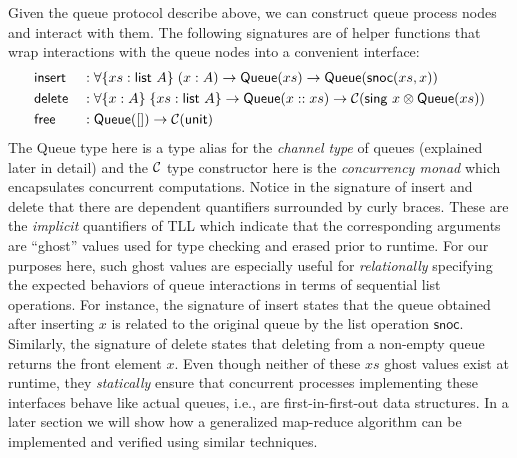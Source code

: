 Given the \textsf{queue} protocol describe above, we can construct queue process nodes and
interact with them. The following signatures are of helper functions that wrap interactions with
the queue nodes into a convenient interface:
\begin{alignat*}{2}
  &\textsf{insert} &&: \forall \{xs : \textsf{list}\ A\}\;(x: A) \rightarrow \textsf{Queue}(xs) \rightarrow \textsf{Queue}(\textsf{snoc}(xs, x)) \\
  &\textsf{delete} &&: \forall \{x: A\}\;\{xs : \textsf{list}\ A\} \rightarrow
    \textsf{Queue}(x :: xs) \rightarrow \mcC (\textsf{sing}\ x \otimes \textsf{Queue}(xs)) \\
  &\textsf{free}   &&: \textsf{Queue}([]) \rightarrow \mcC(\textsf{unit})
\end{alignat*}
The \textsf{Queue} type here is a type alias for the \emph{channel type} of queues
(explained later in detail) and the $\mathcal{C}$ type constructor here is the \emph{concurrency monad}
which encapsulates concurrent computations. Notice in the signature of \textsf{insert} and
\textsf{delete} that there are dependent quantifiers surrounded by curly braces.
These are the \emph{implicit} quantifiers of TLL which indicate that the corresponding arguments
are ``ghost'' values used for type checking and erased prior to runtime. For our purposes here,
such ghost values are especially useful for \emph{relationally} specifying the expected
behaviors of queue interactions in terms of sequential list operations. For instance, the
signature of \textsf{insert} states that the queue obtained after inserting $x$ is related to
the original queue by the list operation $\textsf{snoc}$. Similarly, the signature of
\textsf{delete} states that deleting from a non-empty queue returns the front element $x$.
Even though neither of these $xs$ ghost values exist at runtime, they \emph{statically} ensure
that concurrent processes implementing these interfaces behave like actual queues, i.e.,
are first-in-first-out data structures. In a later section we will show how a generalized
map-reduce algorithm can be implemented and verified using similar techniques.



